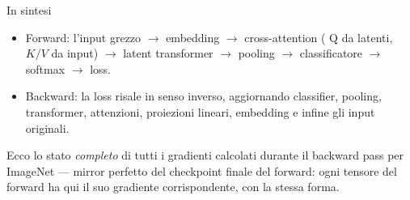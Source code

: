 \documentclass[
  11pt,
]{article}
\begin{document}
In sintesi

\begin{itemize}
\item
  Forward: l'input grezzo \(\rightarrow\) embedding
  \(\rightarrow\) cross-attention ( Q da latenti, \(K/V\) da input)
  \(\rightarrow\) latent transformer \(\rightarrow\) pooling
  \(\rightarrow\) classificatore \(\rightarrow\) softmax \(\rightarrow\)
  loss.
\item
  Backward: la loss risale in senso inverso, aggiornando classifier,
  pooling, transformer, attenzioni, proiezioni lineari, embedding e
  infine gli input originali.
\end{itemize}

\clearpage
\begin{notabox}[title={\textbf{Checkpoint dimensioni finale --- Backward Pass completo}}]
Ecco lo stato \emph{completo} di tutti i gradienti calcolati durante il backward pass per ImageNet --- mirror perfetto del checkpoint finale del forward: ogni tensore del forward ha qui il suo gradiente corrispondente, con la stessa forma.


\end{notabox}
\end{document}
